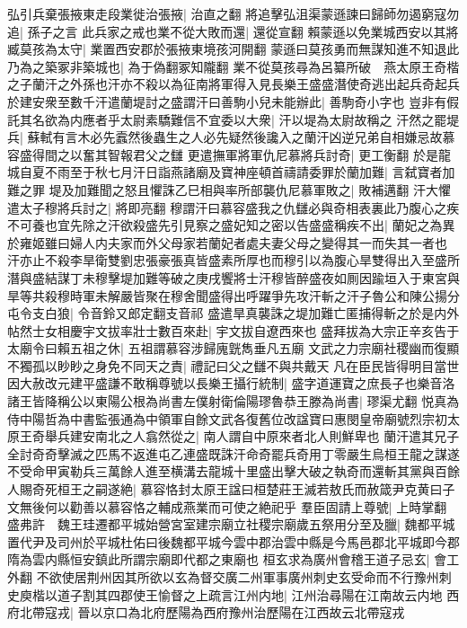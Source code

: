 弘引兵棄張掖東走段業徙治張掖|{
	治直之翻}
將追擊弘沮渠蒙遜諫曰歸師勿遏窮寇勿追|{
	孫子之言}
此兵家之戒也業不從大敗而還|{
	還從宣翻}
賴蒙遜以免業城西安以其將臧莫孩為太守|{
	業置西安郡於張掖東境孩河開翻}
蒙遜曰莫孩勇而無謀知進不知退此乃為之築冢非築城也|{
	為于偽翻冢知隴翻}
業不從莫孩尋為呂纂所破　燕太原王奇楷之子蘭汗之外孫也汗亦不殺以為征南將軍得入見長樂王盛盛潛使奇逃出起兵奇起兵於建安衆至數千汗遣蘭堤討之盛謂汗曰善駒小兒未能辦此|{
	善駒奇小字也}
豈非有假託其名欲為内應者乎太尉素驕難信不宜委以大衆|{
	汗以堤為太尉故稱之}
汗然之罷堤兵|{
	蘇軾有言木必先蠧然後蟲生之人必先疑然後讒入之蘭汗凶逆兄弟自相嫌忌故慕容盛得間之以奮其智報君父之讎}
更遣撫軍將軍仇尼慕將兵討奇|{
	更工衡翻}
於是龍城自夏不雨至于秋七月汗日詣燕諸廟及寶神座頓首禱請委罪於蘭加難|{
	言弑寶者加難之罪}
堤及加難聞之怒且懼誅乙巳相與率所部襲仇尼慕軍敗之|{
	敗補邁翻}
汗大懼遣太子穆將兵討之|{
	將即亮翻}
穆謂汗曰慕容盛我之仇讎必與奇相表裏此乃腹心之疾不可養也宜先除之汗欲殺盛先引見察之盛妃知之密以告盛盛稱疾不出|{
	蘭妃之為異於雍姬雖曰婦人内夫家而外父母家若蘭妃者處夫妻父母之變得其一而失其一者也}
汗亦止不殺李旱衛雙劉忠張豪張真皆盛素所厚也而穆引以為腹心旱雙得出入至盛所潛與盛結謀丁未穆擊堤加難等破之庚戌饗將士汗穆皆醉盛夜如厠因踰垣入于東宮與旱等共殺穆時軍未解嚴皆聚在穆舍聞盛得出呼躍爭先攻汗斬之汗子魯公和陳公揚分屯令支白狼|{
	令音鈴又郎定翻支音祁}
盛遣旱真襲誅之堤加難亡匿捕得斬之於是内外帖然士女相慶宇文拔率壯士數百來赴|{
	宇文拔自遼西來也}
盛拜拔為大宗正辛亥告于太廟令曰賴五祖之休|{
	五祖謂慕容涉歸廆皝雋垂凡五廟}
文武之力宗廟社稷幽而復顯不獨孤以眇眇之身免不同天之責|{
	禮記曰父之讎不與共戴天}
凡在臣民皆得明目當世因大赦改元建平盛謙不敢稱尊號以長樂王攝行統制|{
	盛字道運寶之庶長子也樂音洛}
諸王皆降稱公以東陽公根為尚書左僕射衛倫陽璆魯恭王滕為尚書|{
	璆渠尤翻}
悦真為侍中陽哲為中書監張通為中領軍自餘文武各復舊位改諡寶曰惠閔皇帝廟號烈宗初太原王奇舉兵建安南北之人翕然從之|{
	南人謂自中原來者北人則鮮卑也}
蘭汗遣其兄子全討奇奇擊滅之匹馬不返進屯乙連盛既誅汗命奇罷兵奇用丁零嚴生烏桓王龍之謀遂不受命甲寅勒兵三萬餘人進至横溝去龍城十里盛出擊大破之執奇而還斬其黨與百餘人賜奇死桓王之嗣遂絶|{
	慕容恪封太原王諡曰桓楚莊王滅若敖氏而赦箴尹克黄曰子文無後何以勸善以慕容恪之輔成燕業而可使之絶祀乎}
羣臣固請上尊號|{
	上時掌翻}
盛弗許　魏王珪遷都平城始營宮室建宗廟立社稷宗廟歲五祭用分至及臘|{
	魏都平城置代尹及司州於平城杜佑曰後魏都平城今雲中郡治雲中縣是今馬邑郡北平城即今郡隋為雲内縣恒安鎮此所謂宗廟即代都之東廟也}
桓玄求為廣州會稽王道子忌玄|{
	會工外翻}
不欲使居荆州因其所欲以玄為督交廣二州軍事廣州刺史玄受命而不行豫州刺史庾楷以道子割其四郡使王愉督之上疏言江州内地|{
	江州治尋陽在江南故云内地}
西府北帶寇戎|{
	晉以京口為北府歷陽為西府豫州治歷陽在江西故云北帶寇戎}
